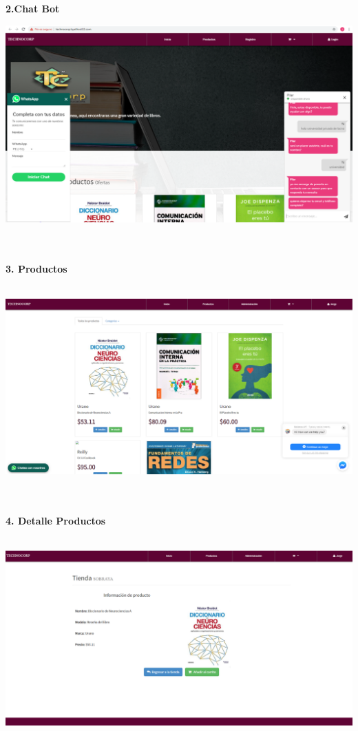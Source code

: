 \begin{flushleft}
\begin{itemize}
\textbf{2.Chat Bot }\\
\begin{center}
	\includegraphics[width=16cm]{./Imagenes/web} 
\end{center}
\textbf{ }\\
\textbf{ }\\
\textbf{3. Productos }\\
\textbf{ }\\
\begin{center}
	\includegraphics[width=16cm]{./Imagenes/front1} 
\end{center}
\textbf{ }\\
\textbf{ }\\
\textbf{4. Detalle Productos }\\
\textbf{ }\\
\begin{center}
	\includegraphics[width=16cm]{./Imagenes/front2} 
\end{center}


\end{itemize}
\end{flushleft}
